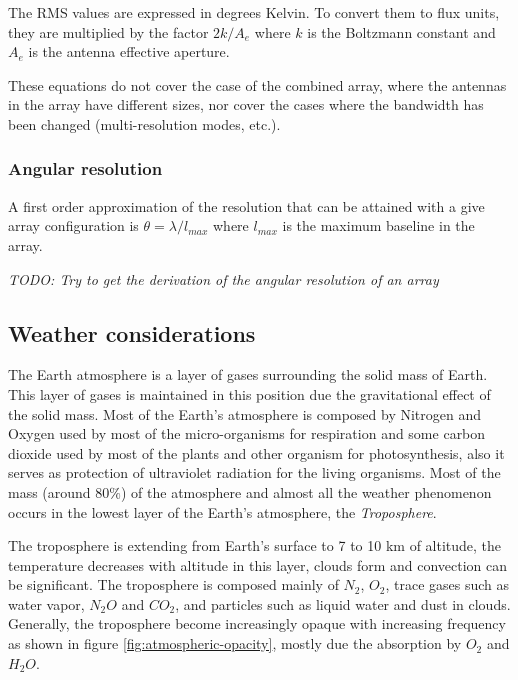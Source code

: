 The RMS values are expressed in degrees Kelvin. To convert them to flux units, they are multiplied by the factor $2k/A_e$ where $k$ is the Boltzmann constant and $A_e$ is the antenna effective aperture.

These equations do not cover the case of the combined array, where the antennas in the array have different sizes, nor cover the cases where the bandwidth has been changed (multi-resolution modes, etc.).

\subsubsection{Angular resolution}
\label{sec:angular-res}
A first order approximation of the resolution that can be attained with a give
array configuration is $\theta = \lambda / l_{max}$ where $l_{max}$ is the maximum
baseline in the array.

\textit{TODO: Try to get the derivation of the angular resolution of an array}

\subsection{Weather considerations}

The Earth atmosphere is a layer of gases surrounding the solid mass of Earth. This layer of gases is maintained in this position due the gravitational effect of the solid mass. Most of the Earth's atmosphere is composed by Nitrogen and Oxygen used by most of the micro-organisms for respiration and some carbon dioxide used by most of the plants and other organism for photosynthesis,	also it serves as protection of ultraviolet radiation for the living organisms. Most of the mass (around $80\%$) of the atmosphere and almost all the weather phenomenon occurs in the lowest layer of the Earth's atmosphere, the \textit{Troposphere}.

The troposphere is extending from Earth's surface to 7 to 10 km of altitude, the temperature decreases with altitude in this layer, clouds form and convection can be significant. The troposphere is composed mainly of $N_2$, $O_2$, trace gases such as water vapor, $N_2O$ and $CO_2$, and particles such as liquid water and dust in clouds. Generally, the troposphere become increasingly opaque with increasing frequency as shown in figure \ref{fig:atmospheric-opacity}, mostly due the absorption by $O_2$ and $H_2O$.

